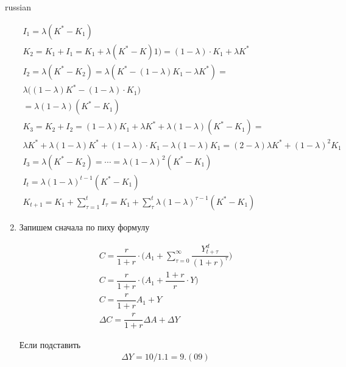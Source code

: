 \documentclass{article}
\begin{document}
\begin{otherlanguage*}{russian}
\begin{enumerate}
\begin{align*}
I_1 = \lambda (K^* - K_1) \\
K_2 = K_1 + I_1 = K_1 + \lambda (K^* - K)1) = (1 - \lambda) \cdot K_1 + \lambda K^* \\
I_2 = \lambda (K^* - K_2 ) = \lambda (K^* - (1 - \lambda) K_1 - \lambda K^ * ) = \\
 \lambda \Big( (1 - \lambda) K^* - (1 - \lambda ) \cdot K_1 \Big) \\
 = \lambda (1 - \lambda ) (K^* - K_1) \\
 K_3 = K_2 + I_2 = (1 - \lambda) K_1 + \lambda K^* + \lambda (1 - \lambda  ) (K^* - K_1) = \\
 \lambda K^ * + \lambda ( 1 - \lambda) K^* + (1 - \lambda) \cdot K_1 - \lambda (1 - \lambda) K_1 =  (2 - \lambda) \lambda K^ * + (1 - \lambda)^ 2 K_1 \\
 I_3 = \lambda ( K^* - K_2) = \cdots = \lambda (1 - \lambda) ^ 2 (K^* - K_1) \\
I_t = \lambda ( 1 - \lambda)^{t-1} (K^* - K_1) \\
K_{t+1} = K_1 + \sum_{\tau=1}^t I_\tau = K_1 + \sum_{\tau}^t \lambda (1 - \lambda)^{\tau - 1} (K^* - K_1) 
\end{align*}

\item Запишем сначала по пиху формулу

\begin{align*}
C = \dfrac{r}{1 + r } \cdot \Big( A_1 +  \sum_{\tau = 0}^\infty \dfrac{Y_{t + \tau}^d}{(1 + r) ^ \tau} \Big) \\
C = \dfrac{r}{1 + r} \cdot \Big( A_1 + \dfrac{1 + r}{r} \cdot  Y  \Big) \\
C = \dfrac{r}{1 + r} A_1 + Y \\
\Delta C = \dfrac{r}{1 + r} \Delta A + \Delta Y 
\end{align*}

Если подставить 
\begin{align*}
\Delta Y = 10 / 1.1 = 9.(09) 
\end{align*}
\end{enumerate}
\end{otherlanguage*} 
\end{document}

